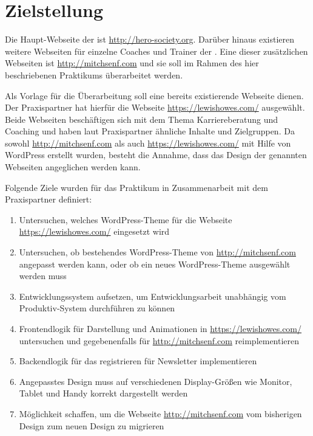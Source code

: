 
\chapter{Zielstellung}



Die Haupt-Webseite der  ist \url{http://hero-society.org}. Darüber hinaus existieren weitere Webseiten für einzelne Coaches und Trainer der . Eine dieser zusätzlichen Webseiten ist \url{http://mitchsenf.com} und sie soll im Rahmen des hier beschriebenen Praktikums überarbeitet werden.

Als Vorlage für die Überarbeitung soll eine bereits existierende Webseite dienen. Der Praxispartner hat hierfür die Webseite \url{https://lewishowes.com/} ausgewählt. Beide Webseiten beschäftigen sich mit dem Thema Karriereberatung und Coaching und haben laut Praxispartner ähnliche Inhalte und Zielgruppen. Da sowohl \url{http://mitchsenf.com} als auch \url{https://lewishowes.com/} mit Hilfe von WordPress erstellt wurden, besteht die Annahme, dass das Design der genannten Webseiten angeglichen werden kann.

Folgende Ziele wurden für das Praktikum in Zusammenarbeit mit dem Praxispartner definiert:

\begin{enumerate}
	\item Untersuchen, welches WordPress-Theme für die Webseite \url{https://lewishowes.com/} eingesetzt wird
	\item Untersuchen, ob bestehendes WordPress-Theme von \url{http://mitchsenf.com} angepasst werden kann, oder ob ein neues WordPress-Theme ausgewählt werden muss
	\item Entwicklungssystem aufsetzen, um Entwicklungsarbeit unabhängig vom Produktiv-System durchführen zu können
	\item Frontendlogik für Darstellung und Animationen in \url{https://lewishowes.com/} untersuchen und gegebenenfalls für \url{http://mitchsenf.com} reimplementieren
	\item Backendlogik für das registrieren für Newsletter implementieren
	\item Angepasstes Design muss auf verschiedenen Display-Größen wie Monitor, Tablet und Handy korrekt dargestellt werden
	\item Möglichkeit schaffen, um die Webseite \url{http://mitchsenf.com} vom bisherigen Design zum neuen Design zu migrieren
\end{enumerate}